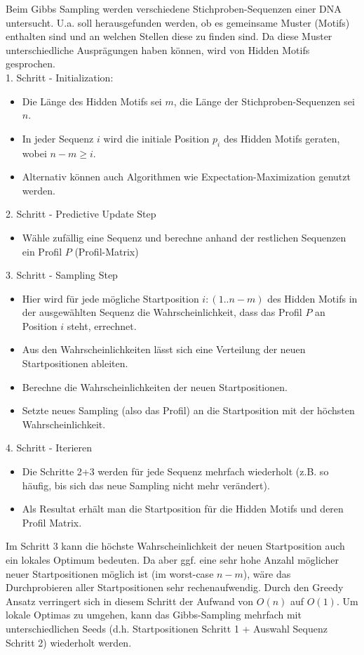 \documentclass{homework}
\begin{document}
\begin{enumerate}
Beim Gibbs Sampling werden verschiedene Stichproben-Sequenzen einer DNA untersucht. U.a. soll herausgefunden werden, ob es gemeinsame Muster (Motifs) enthalten sind und an welchen Stellen diese zu finden sind. Da diese Muster unterschiedliche Ausprägungen haben können, wird von Hidden Motifs gesprochen.\\
1. Schritt - Initialization:
\begin{itemize}
	\item Die Länge des Hidden Motifs sei $m$, die Länge der Stichproben-Sequenzen sei $n$.
	\item In jeder Sequenz $i$ wird die initiale Position $p_i$ des Hidden Motifs geraten, wobei $n-m \geq i$.
	\item Alternativ können auch Algorithmen wie Expectation-Maximization genutzt werden.
\end{itemize}
2. Schritt - Predictive Update Step
\begin{itemize}
	\item Wähle zufällig eine Sequenz und berechne anhand der restlichen Sequenzen ein Profil $P$ (Profil-Matrix)
\end{itemize}
3. Schritt - Sampling Step
\begin{itemize}
	\item Hier wird für jede mögliche Startposition $i:(1..n-m)$ des Hidden Motifs in der ausgewählten Sequenz die Wahrscheinlichkeit, dass das Profil $P$ an Position $i$ steht, errechnet.
	\item Aus den Wahrscheinlichkeiten lässt sich eine Verteilung der neuen Startpositionen ableiten.
	\item Berechne die Wahrscheinlichkeiten der neuen Startpositionen.
	\item Setzte neues Sampling (also das Profil) an die Startposition mit der höchsten Wahrscheinlichkeit.
\end{itemize}
4. Schritt - Iterieren
\begin{itemize}
	\item Die Schritte 2+3 werden für jede Sequenz mehrfach wiederholt (z.B. so häufig, bis sich das neue Sampling nicht mehr verändert).
	\item Als Resultat erhält man die Startposition für die Hidden Motifs und deren Profil Matrix.
\end{itemize}

Im Schritt 3 kann die höchste Wahrscheinlichkeit der neuen Startposition auch ein lokales Optimum bedeuten. Da aber ggf. eine sehr hohe Anzahl möglicher neuer Startpositionen möglich ist (im worst-case $n-m$), wäre das Durchprobieren aller Startpositionen sehr rechenaufwendig. Durch den Greedy Ansatz verringert sich in diesem Schritt der Aufwand von $O(n)$ auf $O(1)$. Um lokale Optimas zu umgehen, kann das Gibbs-Sampling mehrfach mit unterschiedlichen Seeds (d.h. Startpositionen Schritt 1 + Auswahl Sequenz Schritt 2) wiederholt werden. 


\end{enumerate}
\end{document}

